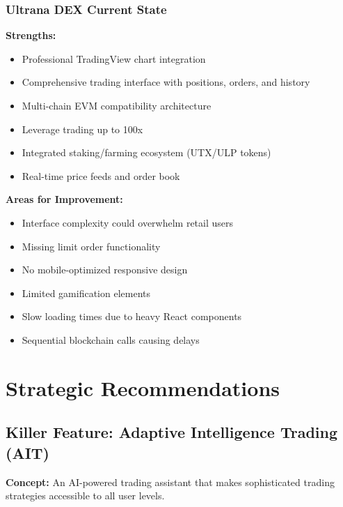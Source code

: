\documentclass{article}
\begin{document}
\subsubsection{Ultrana DEX Current State}
\textbf{Strengths:}
\begin{itemize}[leftmargin=*]
    \item Professional TradingView chart integration
    \item Comprehensive trading interface with positions, orders, and history
    \item Multi-chain EVM compatibility architecture
    \item Leverage trading up to 100x
    \item Integrated staking/farming ecosystem (UTX/ULP tokens)
    \item Real-time price feeds and order book
\end{itemize}

\textbf{Areas for Improvement:}
\begin{itemize}[leftmargin=*]
    \item Interface complexity could overwhelm retail users
    \item Missing limit order functionality
    \item No mobile-optimized responsive design
    \item Limited gamification elements
    \item Slow loading times due to heavy React components
    \item Sequential blockchain calls causing delays
\end{itemize}

\section{Strategic Recommendations}

\subsection{Killer Feature: Adaptive Intelligence Trading (AIT)}

\textbf{Concept:} An AI-powered trading assistant that makes sophisticated trading strategies accessible to all user levels.
\end{document}
